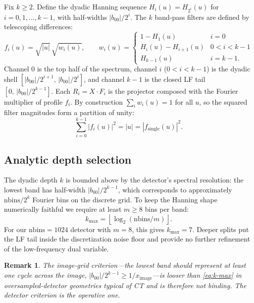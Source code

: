 \documentclass{article}
\newtheorem{remark}[theorem]{Remark}
\begin{document}
Fix $k \ge 2$. Define the dyadic Hanning sequence
$H_i(u) = H_{2^i}(u)$ for $i = 0, 1, \ldots, k-1$, with half-widths
$|b_{00}|/2^i$. The $k$ band-pass filters are defined by telescoping
differences:
\begin{equation}\label{eq:dyadic-filters}
  f_i(u) = \sqrt{|u|}\,\sqrt{w_i(u)},
  \qquad
  w_i(u) = \begin{cases}
    1 - H_1(u) & i = 0 \\
    H_i(u) - H_{i+1}(u) & 0 < i < k-1 \\
    H_{k-1}(u) & i = k-1.
  \end{cases}
\end{equation}
Channel $0$ is the top half of the spectrum, channel $i$
($0 < i < k-1$) is the dyadic shell $[|b_{00}|/2^{i+1},\,|b_{00}|/2^i]$,
and channel $k-1$ is the closed LF tail $[0,\,|b_{00}|/2^{k-1}]$. Each
$R_i = X \cdot F_i$ is the projector composed with the Fourier
multiplier of profile $f_i$. By construction $\sum_i w_i(u) = 1$ for
all $u$, so the squared filter magnitudes form a partition of unity:
\begin{equation}\label{eq:pou}
  \sum_{i=0}^{k-1} |f_i(u)|^2 = |u| = |f_\text{single}(u)|^2.
\end{equation}

\subsection{Analytic depth selection}\label{sec:depth}

The dyadic depth $k$ is bounded above by the detector's spectral
resolution: the lowest band has half-width $|b_{00}|/2^{k-1}$, which
corresponds to approximately $\text{nbins}/2^k$ Fourier bins on the
discrete grid. To keep the Hanning shape numerically faithful we
require at least $m \ge 8$ bins per band:
\begin{equation}\label{eq:k-max}
  k_\text{max} = \left\lfloor \log_2(\text{nbins}/m) \right\rfloor.
\end{equation}
For our $\text{nbins} = 1024$ detector with $m = 8$, this gives
$k_\text{max} = 7$. Deeper splits put the LF tail inside the
discretization noise floor and provide no further refinement of the
low-frequency dual variable.

\begin{remark}
The image-grid criterion---the lowest band should represent at least
one cycle across the image, $|b_{00}|/2^{k-1} \ge 1/x_\text{image}$---is
looser than \eqref{eq:k-max} in oversampled-detector geometries
typical of CT and is therefore not binding. The detector criterion is
the operative one.
\end{remark}
\end{document}
